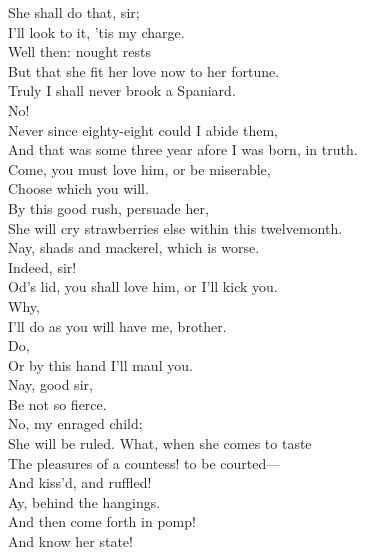 \documentclass[a4paper,oneside]{memoir}
\begin{document}
\begin{drama*}
\kastrilspeaks {} She shall do that, sir;\\
I'll look to it, 'tis my charge.\\
\subtlespeaks {} Well then: nought rests\\
But that she fit her love now to her fortune.\\
\pliantspeaks Truly I shall never brook a Spaniard.\\
\subtlespeaks No!\\
\pliantspeaks {} Never since eighty-eight could I abide them,\\
And that was some three year afore I was born, in truth.\\
\subtlespeaks Come, you must love him, or be miserable,\\
Choose which you will.\\
\facespeaks {} By this good rush, persuade her,\\
She will cry strawberries else within this twelvemonth.\\
\subtlespeaks Nay, shads and mackerel, which is worse.\\
\facespeaks {} Indeed, sir!\\
\kastrilspeaks Od's lid, you shall love him, or I'll kick you.\\
\pliantspeaks Why,\\
I'll do as you will have me, brother.\\
\kastrilspeaks {} Do,\\
Or by this hand I'll maul you.\\
\facespeaks {} Nay, good sir,\\
Be not so fierce.\\
\subtlespeaks {} No, my enraged child;\\
She will be ruled. What, when she comes to taste\\
The pleasures of a countess! to be courted---\\
\facespeaks And kiss'd, and ruffled!\\
\subtlespeaks {} Ay, behind the hangings.\\
\facespeaks And then come forth in pomp!\\
\subtlespeaks {} And know her state!\\

\end{drama*}
\end{document}
